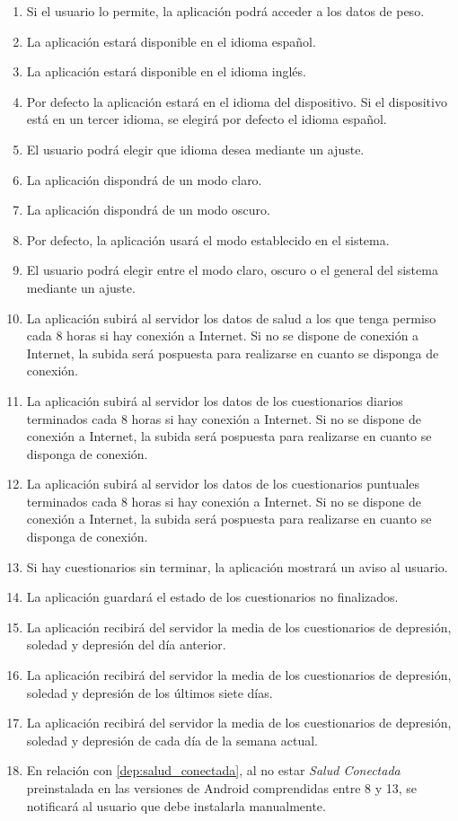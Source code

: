 \begin{enumerate}
    \item Si el usuario lo permite, la aplicación podrá acceder a los datos de peso.
    \item La aplicación estará disponible en el idioma español.
    \item La aplicación estará disponible en el idioma inglés.
    \item Por defecto la aplicación estará en el idioma del dispositivo. Si el dispositivo está en un tercer idioma, se elegirá por defecto el idioma español.
    \item El usuario podrá elegir que idioma desea mediante un ajuste.
    \item La aplicación dispondrá de un modo claro.
    \item La aplicación dispondrá de un modo oscuro.
    \item Por defecto, la aplicación usará el modo establecido en el sistema.
    \item El usuario podrá elegir entre el modo claro, oscuro o el general del sistema mediante un ajuste.
    \item La aplicación subirá al servidor los datos de salud a los que tenga permiso cada 8 horas si hay conexión a Internet. Si no se dispone de conexión a Internet, la subida será pospuesta para realizarse en cuanto se disponga de conexión.
    \item La aplicación subirá al servidor los datos de los cuestionarios diarios terminados cada 8 horas si hay conexión a Internet. Si no se dispone de conexión a Internet, la subida será pospuesta para realizarse en cuanto se disponga de conexión.
    \item La aplicación subirá al servidor los datos de los cuestionarios puntuales terminados cada 8 horas si hay conexión a Internet. Si no se dispone de conexión a Internet, la subida será pospuesta para realizarse en cuanto se disponga de conexión.
    \item Si hay cuestionarios sin terminar, la aplicación mostrará un aviso al usuario.
    \item La aplicación guardará el estado de los cuestionarios no finalizados.
    \item La aplicación recibirá del servidor la media de los cuestionarios de depresión, soledad y depresión del día anterior.
    \item La aplicación recibirá del servidor la media de los cuestionarios de depresión, soledad y depresión de los últimos siete días.
    \item La aplicación recibirá del servidor la media de los cuestionarios de depresión, soledad y depresión de cada día de la semana actual. 
    \item En relación con \ref{dep:salud_conectada}, al no estar \textit{Salud Conectada} preinstalada en las versiones de Android comprendidas entre 8 y 13, se notificará al usuario que debe instalarla manualmente.

    
    
\end{enumerate}
